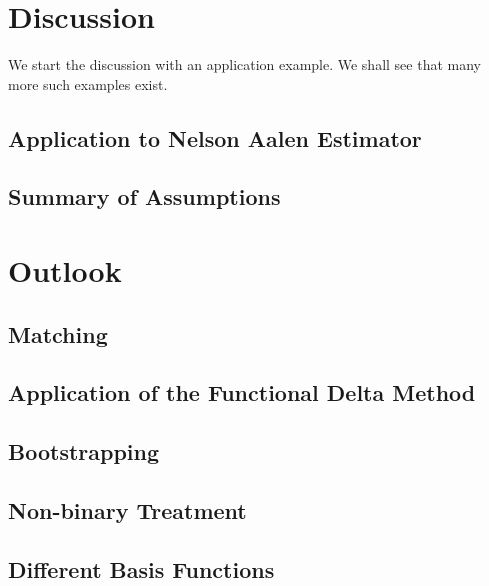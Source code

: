 \section{Discussion}
We start the discussion with an application example. We shall see that many more such examples exist.
\subsection{Application to Nelson Aalen Estimator}
  
\subsection{Summary of Assumptions}
  
\section{Outlook}
\subsection{Matching}
  
\subsection{Application of the Functional Delta Method}
  
\subsection{Bootstrapping} 
  
\subsection{Non-binary Treatment}
  
\subsection{Different Basis Functions}
  
